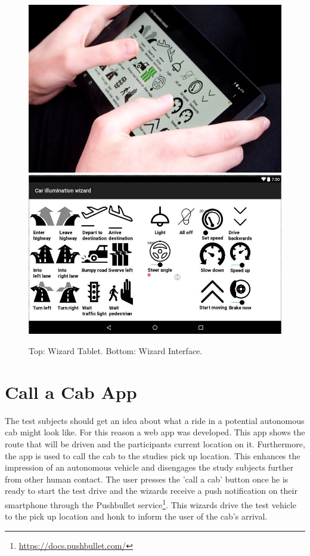 \begin{figure}
    \includegraphics[width=\textwidth]{fig/WizardHands2_1366.png}\hfill\includegraphics[width=\textwidth]{fig/IlluminationWizard-.JPG}
    \caption[Wizard Tab]{Top: Wizard Tablet. 
   Bottom: Wizard Interface.}
    \label{fig:wizard}
\end{figure}

\section{Call a Cab App}
\label{sec:capp}
The test subjects should get an idea about what a ride in a potential autonomous cab might look like. For this reason a web app was developed. This app shows the route that will be driven and the participants current location on it. Furthermore, the app is used to call the cab to the studies pick up location. This enhances the impression of an autonomous vehicle and disengages the study subjects further from other human contact. The user presses the 'call a cab' button once he is ready to start the test drive and the wizards receive a push notification on their smartphone through the Pushbullet service\footnote{\url{https://docs.pushbullet.com/}}. This wizards drive the test vehicle to the pick up location and honk to inform the user of the cab's arrival. 

